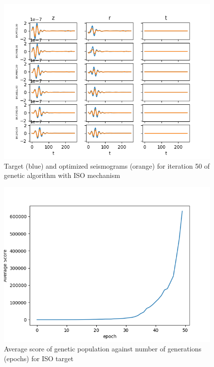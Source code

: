 \documentclass{article}
\begin{document}
\begin{figure}[H]
	\centering
	\includegraphics{dataSet2/plots/optimized49.png}
	\caption{Target (blue) and optimized seismograms (orange) for iteration 50 of genetic algorithm with ISO mechanism}
	\label{convergenceISO3}
\end{figure}

\begin{figure}[H]
	\centering
	\includegraphics{dataSet2/scores.png}
	\caption{Average score of genetic population against number of generations (epochs) for ISO target}
	\label{scoresISO}
\end{figure}
\end{document}
